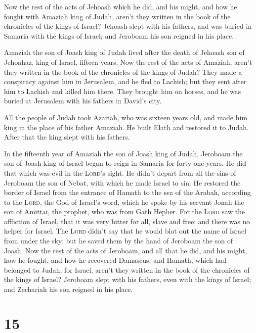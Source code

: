  Now the rest of the acts of Jehoash which he did, and
his might, and how he fought with Amaziah king of Judah, aren't they
written in the book of the chronicles of the kings of Israel?
 Jehoash slept with his fathers, and was buried in
Samaria with the kings of Israel; and Jeroboam his son reigned in his
place.

 Amaziah the son of Joash king of Judah lived after the
death of Jehoash son of Jehoahaz, king of Israel, fifteen years.
 Now the rest of the acts of Amaziah, aren't they written
in the book of the chronicles of the kings of Judah? 
They made a conspiracy against him in Jerusalem, and he fled to Lachish;
but they sent after him to Lachish and killed him there. 
They brought him on horses, and he was buried at Jerusalem with his
fathers in David's city.

 All the people of Judah took Azariah, who was sixteen
years old, and made him king in the place of his father Amaziah.
 He built Elath and restored it to Judah. After that the
king slept with his fathers.

 In the fifteenth year of Amaziah the son of Joash king
of Judah, Jeroboam the son of Joash king of Israel began to reign in
Samaria for forty-one years.  He did that which was evil
in the \textsc{Lord}'s sight. He didn't depart from all the sins of
Jeroboam the son of Nebat, with which he made Israel to sin.
 He restored the border of Israel from the entrance of
Hamath to the sea of the Arabah, according to the \textsc{Lord}, the God
of Israel's word, which he spoke by his servant Jonah the son of
Amittai, the prophet, who was from Gath Hepher.  For the
\textsc{Lord} saw the affliction of Israel, that it was very bitter for
all, slave and free; and there was no helper for Israel. 
The \textsc{Lord} didn't say that he would blot out the name of Israel
from under the sky; but he saved them by the hand of Jeroboam the son of
Joash.  Now the rest of the acts of Jeroboam, and all
that he did, and his might, how he fought, and how he recovered
Damascus, and Hamath, which had belonged to Judah, for Israel, aren't
they written in the book of the chronicles of the kings of Israel?
 Jeroboam slept with his fathers, even with the kings of
Israel; and Zechariah his son reigned in his place.

\hypertarget{section-14}{%
\section{15}\label{section-14}}

